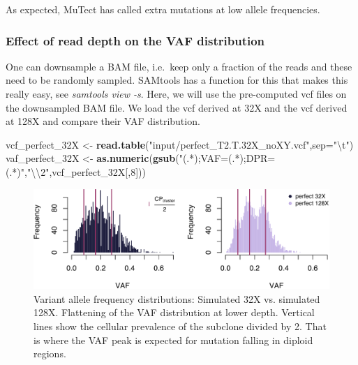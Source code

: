 \documentclass[]{article}
\newenvironment{Shaded}{\begin{snugshade}}{\end{snugshade}}
\newcommand{\CharTok}[1]{\textcolor[rgb]{0.31,0.60,0.02}{#1}}
\newcommand{\DataTypeTok}[1]{\textcolor[rgb]{0.13,0.29,0.53}{#1}}
\newcommand{\DecValTok}[1]{\textcolor[rgb]{0.00,0.00,0.81}{#1}}
\newcommand{\KeywordTok}[1]{\textcolor[rgb]{0.13,0.29,0.53}{\textbf{#1}}}
\newcommand{\NormalTok}[1]{#1}
\newcommand{\StringTok}[1]{\textcolor[rgb]{0.31,0.60,0.02}{#1}}
\begin{document}
As expected, MuTect has called extra mutations at low allele
frequencies.

\hypertarget{effect-of-read-depth-on-the-vaf-distribution}{%
\subsubsection{Effect of read depth on the VAF
distribution}\label{effect-of-read-depth-on-the-vaf-distribution}}

One can downsample a BAM file, i.e.~keep only a fraction of the reads
and these need to be randomly sampled. SAMtools has a function for this
that makes this really easy, see \emph{samtools view -s}. Here, we will
use the pre-computed vcf files on the downsampled BAM file. We load the
vcf derived at 32X and the vcf derived at 128X and compare their VAF
distribution.

\begin{Shaded}
\begin{Highlighting}[]
\NormalTok{vcf_perfect_32X <-}\StringTok{ }\KeywordTok{read.table}\NormalTok{(}\StringTok{"input/perfect_T2.T.32X_noXY.vcf"}\NormalTok{,}\DataTypeTok{sep=}\StringTok{"}\CharTok{\textbackslash{}t}\StringTok{"}\NormalTok{)}
\NormalTok{vaf_perfect_32X <-}\StringTok{ }\KeywordTok{as.numeric}\NormalTok{(}\KeywordTok{gsub}\NormalTok{(}\StringTok{"(.*);VAF=(.*);DPR=(.*)"}\NormalTok{,}\StringTok{"}\CharTok{\textbackslash{}\textbackslash{}}\StringTok{2"}\NormalTok{,vcf_perfect_32X[,}\DecValTok{8}\NormalTok{]))}
\end{Highlighting}
\end{Shaded}

\begin{figure}

{\centering \includegraphics{src_guide_files/figure-latex/fig1b-1} 

}

\caption{\label{fig1b}Variant allele frequency distributions: Simulated 32X vs. simulated 128X. Flattening of the VAF distribution at lower depth. Vertical lines show the cellular prevalence of the subclone divided by 2. That is where the VAF peak is expected for mutation falling in diploid regions.}\label{fig:fig1b}
\end{figure}
\end{document}
